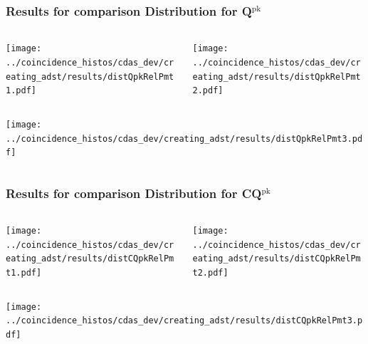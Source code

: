 \documentclass[aspectratio=169]{beamer}
\begin{document}
\begin{frame}
  \frametitle{Results for comparison Distribution for Q$^{\mathrm{pk}}$}

  \begin{columns}
    \centering
    \begin{column}{0.5\textwidth}
      \texttt{[image: ../coincidence\_histos/cdas\_dev/creating\_adst/results/distQpkRelPmt1.pdf]}
    \end{column}
    \begin{column}{0.5\textwidth}
      \texttt{[image: ../coincidence\_histos/cdas\_dev/creating\_adst/results/distQpkRelPmt2.pdf]}
    \end{column}
  \end{columns}
  \begin{columns}
    \centering
    \begin{column}{0.5\textwidth}
      \texttt{[image: ../coincidence\_histos/cdas\_dev/creating\_adst/results/distQpkRelPmt3.pdf]}
    \end{column}
  \end{columns}
\end{frame}

\begin{frame}
  \frametitle{Results for comparison Distribution for CQ$^{\mathrm{pk}}$}

  \begin{columns}
    \centering
    \begin{column}{0.5\textwidth}
      \texttt{[image: ../coincidence\_histos/cdas\_dev/creating\_adst/results/distCQpkRelPmt1.pdf]}
    \end{column}
    \begin{column}{0.5\textwidth}
      \texttt{[image: ../coincidence\_histos/cdas\_dev/creating\_adst/results/distCQpkRelPmt2.pdf]}
    \end{column}
  \end{columns}
  \begin{columns}
    \centering
    \begin{column}{0.5\textwidth}
      \texttt{[image: ../coincidence\_histos/cdas\_dev/creating\_adst/results/distCQpkRelPmt3.pdf]}
    \end{column}
  \end{columns}
\end{frame}
\end{document}
